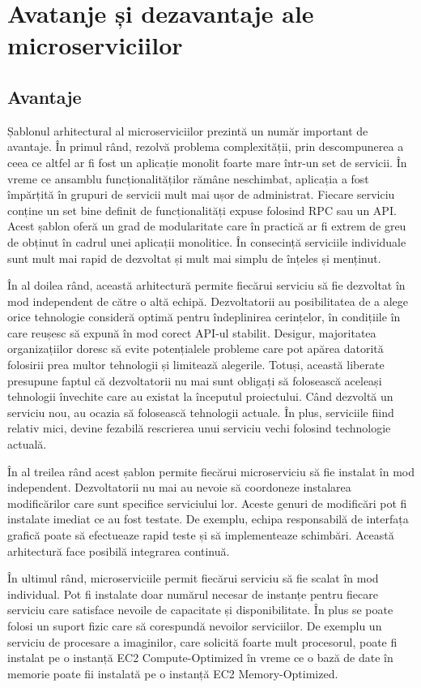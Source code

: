 \documentclass[12pt, a4paper, oneside, romanian]{teza-upb}
\begin{document}
\section{Avatanje și dezavantaje ale microserviciilor}
\subsection{Avantaje}

Șablonul arhitectural al microserviciilor prezintă un număr important de avantaje. În primul rând, rezolvă problema complexității, prin descompunerea a ceea ce altfel ar fi fost un aplicație monolit foarte mare într-un set de servicii. În vreme ce ansamblu funcționalităților rămâne neschimbat, aplicația a fost împărțită în grupuri de servicii mult mai ușor de administrat. Fiecare serviciu conține un set bine definit de funcționalități expuse folosind RPC sau un API. Acest șablon oferă un grad de modularitate care în practică ar fi extrem de greu de obținut în cadrul unei aplicații monolitice. În consecință serviciile individuale sunt mult mai rapid de dezvoltat și mult mai simplu de înțeles și menținut. 

În al doilea rând, această arhitectură permite fiecărui serviciu să fie dezvoltat în mod independent de către o altă echipă. Dezvoltatorii au posibilitatea de a alege orice tehnologie consideră optimă pentru îndeplinirea cerințelor, în condițiile în care reușesc să expună în mod corect API-ul stabilit. Desigur, majoritatea organizațiilor doresc să evite potențialele probleme care pot apărea datorită folosirii prea multor tehnologii și limitează alegerile. Totuși, această liberate presupune faptul că dezvoltatorii nu mai sunt obligați să folosească aceleași tehnologii învechite care au existat la începutul proiectului. Când dezvoltă un serviciu nou, au ocazia să folosească tehnologii actuale. În plus, serviciile fiind relativ mici, devine fezabilă rescrierea unui serviciu vechi folosind technologie actuală. 

În al treilea rând acest șablon permite fiecărui microserviciu să fie instalat în mod independent. Dezvoltatorii nu mai au nevoie să coordoneze instalarea modificărilor care sunt specifice serviciului lor. Aceste genuri de modificări pot fi instalate imediat ce au fost testate. De exemplu, echipa responsabilă de interfața grafică poate să efectueaze rapid teste și să implementeaze schimbări. Această arhitectură face posibilă integrarea continuă. 

În ultimul rând, microserviciile permit fiecărui serviciu să fie scalat în mod individual. Pot fi instalate doar numărul necesar de instanțe pentru fiecare serviciu care satisface nevoile de capacitate și disponibilitate. În plus se poate folosi un suport fizic care să corespundă nevoilor serviciilor. De exemplu un serviciu de procesare a imaginilor, care solicită foarte mult procesorul, poate fi instalat pe o instanță EC2 Compute-Optimized în vreme ce o bază de date în memorie poate fii instalată pe o instanță EC2 Memory-Optimized.
\end{document}

